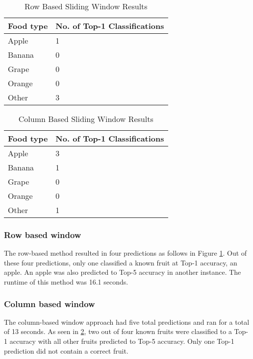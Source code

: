 \begin{table}[]
	\centering
	\caption{Row Based Sliding Window Results}
	\label{rowWindowTable}
	\begin{tabular}{|l|l|}
	\hline
		\textbf{Food type} & \textbf{No. of Top-1 Classifications} \\ \hline
		Apple     & 1                      \\ \hline
		Banana    & 0                      \\ \hline
		Grape     & 0                      \\ \hline
		Orange    & 0                      \\ \hline
		Other     & 3                     \\ \hline
	\end{tabular}
\end{table}

\begin{table}[]
	\centering
	\caption{Column Based Sliding Window Results}
	\label{colWindowTable}
	\begin{tabular}{|l|l|}
	\hline
		\textbf{Food type} & \textbf{No. of Top-1 Classifications} \\ \hline
		Apple     & 3                      \\ \hline
		Banana    & 1                      \\ \hline
		Grape     & 0                      \\ \hline
		Orange    & 0                      \\ \hline
		Other     & 1                     \\ \hline
	\end{tabular}
\end{table}

\subsubsection*{Row based window}
The row-based method resulted in four predictions as follows in Figure
\ref{rowWindowTable}. Out of these four predictions, only one classified a known
fruit at Top-1 accuracy, an apple. An apple was also predicted to Top-5 accuracy
in another instance. The runtime of this method was 16.1 seconds.

\subsubsection*{Column based window}
The column-based window approach had five total predictions and ran for a total
of 13 seconds. As seen in \ref{colWindowTable}, two out of four known fruits
were classified to a Top-1 accuracy with all other fruits predicted to Top-5
accuracy. Only one Top-1 prediction did not contain a correct fruit.

